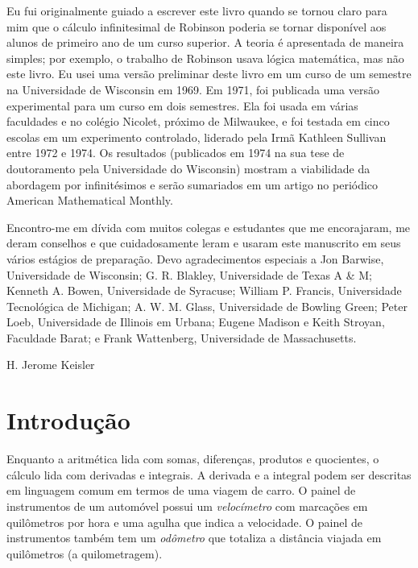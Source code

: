 \documentclass{svmono}
\begin{document}
Eu fui originalmente guiado a escrever este livro quando se tornou claro
para mim que o cálculo infinitesimal de Robinson poderia se tornar
disponível aos alunos de primeiro ano de um curso superior. A teoria é
apresentada de maneira simples; por exemplo, o trabalho de Robinson
usava lógica matemática, mas não este livro. Eu usei uma versão preliminar
deste livro em um curso de um semestre na Universidade de Wisconsin em
1969. Em 1971, foi publicada uma versão experimental para um curso em
dois semestres. Ela foi usada em várias faculdades e no colégio Nicolet,
próximo de Milwaukee, e foi testada em cinco escolas em um experimento
controlado, liderado pela Irmã Kathleen Sullivan entre 1972 e 1974. Os
resultados (publicados em 1974 na sua tese de doutoramento pela Universidade
do Wisconsin) mostram a viabilidade da abordagem por infinitésimos e serão
sumariados em um artigo no periódico American Mathematical Monthly.

Encontro-me em dívida com muitos colegas e estudantes que me encorajaram,
me deram conselhos e que cuidadosamente leram e usaram este manuscrito
em seus vários estágios de preparação. Devo agradecimentos especiais a
Jon Barwise, Universidade de Wisconsin; G. R. Blakley, Universidade de
Texas A \& M; Kenneth A. Bowen, Universidade de Syracuse; William P.
Francis, Universidade Tecnológica de Michigan; A. W. M. Glass,
Universidade de Bowling Green; Peter Loeb, Universidade de Illinois em
Urbana; Eugene Madison e Keith Stroyan, Faculdade Barat; e Frank Wattenberg,
Universidade de Massachusetts.

\hfill H. Jerome Keisler

\tableofcontents

\chapter*{Introdução}

\graphicspath{ {./figuras/chp_reals/} }

Enquanto a aritmética lida com somas, diferenças, produtos e quocientes, o
cálculo lida com derivadas e integrais. A derivada e a integral podem
ser descritas em linguagem comum em termos de uma viagem de carro. O
painel de instrumentos de um automóvel possui um \emph{velocímetro}
com marcações em quilômetros por hora e uma agulha que indica a velocidade.
O painel de instrumentos também tem um \emph{odômetro} que totaliza a
distância viajada em quilômetros (a quilometragem).
\end{document}
